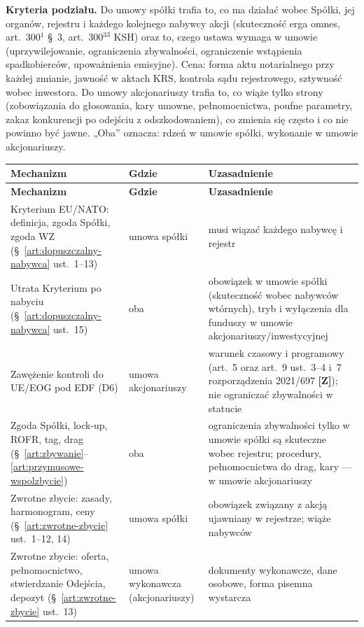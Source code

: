 \documentclass[12pt,a4paper]{report}
\newcommand{\Wiar}[1]{\textbf{[#1]}}
\begin{document}
\textbf{Kryteria podziału.} Do umowy spółki trafia to, co ma działać wobec Spółki, jej organów, rejestru i każdego kolejnego nabywcy akcji (skuteczność erga omnes, art.~300$^{1}$ §~3, art.~300$^{33}$ KSH) oraz to, czego ustawa wymaga w umowie (uprzywilejowanie, ograniczenia zbywalności, ograniczenie wstąpienia spadkobierców, upoważnienia emisyjne). Cena: forma aktu notarialnego przy każdej zmianie, jawność w aktach KRS, kontrola sądu rejestrowego, sztywność wobec inwestora. Do umowy akcjonariuszy trafia to, co wiąże tylko strony (zobowiązania do głosowania, kary umowne, pełnomocnictwa, poufne parametry, zakaz konkurencji po odejściu z odszkodowaniem), co zmienia się często i co nie powinno być jawne. „Oba” oznacza: rdzeń w umowie spółki, wykonanie w umowie akcjonariuszy.

\begin{longtable}{@{}p{4.6cm} p{2.4cm} p{7.2cm}@{}}
\toprule
\textbf{Mechanizm} & \textbf{Gdzie} & \textbf{Uzasadnienie} \\
\midrule
\endfirsthead
\toprule
\textbf{Mechanizm} & \textbf{Gdzie} & \textbf{Uzasadnienie} \\
\midrule
\endhead
Kryterium EU/NATO: definicja, zgoda Spółki, zgoda WZ (§~\ref{art:dopuszczalny-nabywca} ust.~1--13) & umowa spółki & musi wiązać każdego nabywcę i rejestr \\
Utrata Kryterium po nabyciu (§~\ref{art:dopuszczalny-nabywca} ust.~15) & oba & obowiązek w umowie spółki (skuteczność wobec nabywców wtórnych), tryb i wyłączenia dla funduszy w umowie akcjonariuszy/inwestycyjnej \\
Zawężenie kontroli do UE/EOG pod EDF (D6) & umowa akcjonariuszy & warunek czasowy i programowy (art.~5 oraz art.~9 ust.~3--4 i~7 rozporządzenia 2021/697 \Wiar{Z}); nie ograniczać zbywalności w statucie \\
Zgoda Spółki, lock-up, ROFR, tag, drag (§~\ref{art:zbywanie}--\ref{art:przymusowe-wspolzbycie}) & oba & ograniczenia zbywalności tylko w umowie spółki są skuteczne wobec rejestru; procedury, pełnomocnictwa do drag, kary --- w umowie akcjonariuszy \\
Zwrotne zbycie: zasady, harmonogram, ceny (§~\ref{art:zwrotne-zbycie} ust.~1--12, 14) & umowa spółki & obowiązek związany z akcją ujawniany w rejestrze; wiąże nabywców \\
Zwrotne zbycie: oferta, pełnomocnictwo, stwierdzanie Odejścia, depozyt (§~\ref{art:zwrotne-zbycie} ust.~13) & umowa wykonawcza (akcjonariuszy) & dokumenty wykonawcze, dane osobowe, forma pisemna wystarcza \\

\end{longtable}
\end{document}
